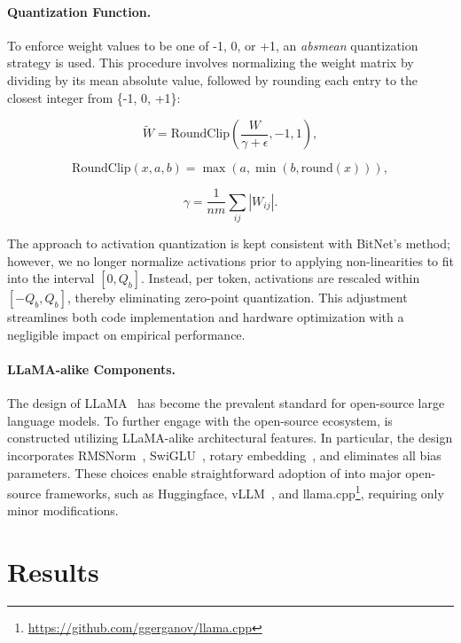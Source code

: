 \paragraph{Quantization Function.} To enforce weight values to be one of -1, 0, or +1, an \emph{absmean} quantization strategy is used. This procedure involves normalizing the weight matrix by dividing by its mean absolute value, followed by rounding each entry to the closest integer from \{-1, 0, +1\}:

\begin{equation}
    \widetilde{W} = \mathrm{RoundClip}(\frac{W}{\gamma + \epsilon}, -1, 1),
\end{equation}

\begin{equation}
    \mathrm{RoundClip}(x, a, b) = \max(a, \min(b, \mathrm{round}(x))),
\end{equation}

\begin{equation}
    \gamma = \frac{1}{nm}\sum_{ij} |W_{ij}|.
\end{equation}

The approach to activation quantization is kept consistent with BitNet's method; however, we no longer normalize activations prior to applying non-linearities to fit into the interval $[0, Q_b]$. Instead, per token, activations are rescaled within $[-Q_b, Q_b]$, thereby eliminating zero-point quantization. This adjustment streamlines both code implementation and hardware optimization with a negligible impact on empirical performance.

\paragraph{LLaMA-alike Components.}

The design of LLaMA~\cite{llama, llama2} has become the prevalent standard for open-source large language models. To further engage with the open-source ecosystem,  is constructed utilizing LLaMA-alike architectural features. In particular, the design incorporates RMSNorm~\cite{rmsnorm}, SwiGLU~\cite{swiglu}, rotary embedding~\cite{rope}, and eliminates all bias parameters. These choices enable straightforward adoption of  into major open-source frameworks, such as Huggingface, vLLM~\cite{vllm}, and llama.cpp\footnote{\url{https://github.com/ggerganov/llama.cpp}}, requiring only minor modifications.

\section{Results}

